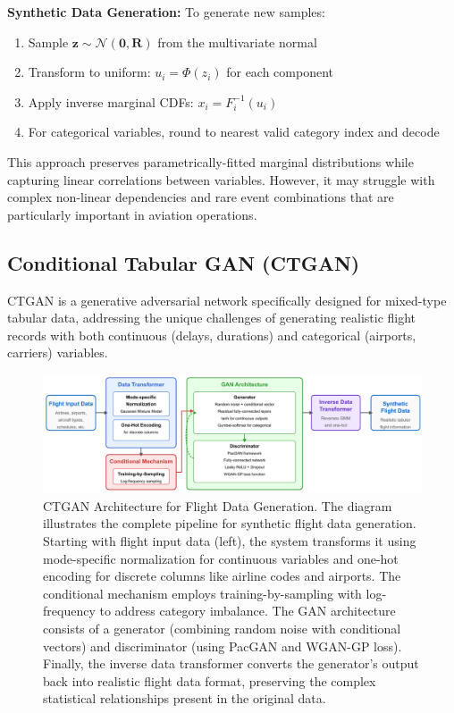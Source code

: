 \documentclass[conference]{IEEEtran}
\begin{document}
\textbf{Synthetic Data Generation:} To generate new samples:
\begin{enumerate}
    \item Sample $\mathbf{z} \sim \mathcal{N}(\mathbf{0}, \mathbf{R})$ from the multivariate normal
    \item Transform to uniform: $u_i = \Phi(z_i)$ for each component
    \item Apply inverse marginal CDFs: $x_i = F_i^{-1}(u_i)$
    \item For categorical variables, round to nearest valid category index and decode
\end{enumerate}

This approach preserves parametrically-fitted marginal distributions while capturing linear correlations between variables. However, it may struggle with complex non-linear dependencies and rare event combinations that are particularly important in aviation operations.


\subsection{Conditional Tabular GAN (CTGAN)}

CTGAN \cite{xu2019modeling} is a generative adversarial network specifically designed for mixed-type tabular data, addressing the unique challenges of generating realistic flight records with both continuous (delays, durations) and categorical (airports, carriers) variables.

\begin{figure}[htbp]
    \centering
    \includegraphics[width=\linewidth]{diagrams/ctgan.pdf}
    \caption{CTGAN Architecture for Flight Data Generation. The diagram illustrates the complete pipeline for synthetic flight data generation. Starting with flight input data (left), the system transforms it using mode-specific normalization for continuous variables and one-hot encoding for discrete columns like airline codes and airports. The conditional mechanism employs training-by-sampling with log-frequency to address category imbalance. The GAN architecture consists of a generator (combining random noise with conditional vectors) and discriminator (using PacGAN and WGAN-GP loss). Finally, the inverse data transformer converts the generator's output back into realistic flight data format, preserving the complex statistical relationships present in the original data.}
    \label{fig:ctgan_architecture}
\end{figure}
\end{document}

